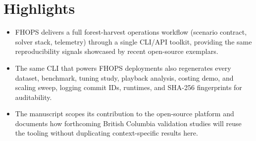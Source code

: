 \section*{Highlights}
\begin{itemize}
  \item FHOPS delivers a full forest-harvest operations workflow (scenario contract, solver stack, telemetry) through a single CLI/API toolkit, providing the same reproducibility signals showcased by recent open-source exemplars.
  \item The same CLI that powers FHOPS deployments also regenerates every dataset, benchmark, tuning study, playback analysis, costing demo, and scaling sweep, logging commit IDs, runtimes, and SHA-256 fingerprints for auditability.
  \item The manuscript scopes its contribution to the open-source platform and documents how forthcoming British Columbia validation studies will reuse the tooling without duplicating context-specific results here.
\end{itemize}
